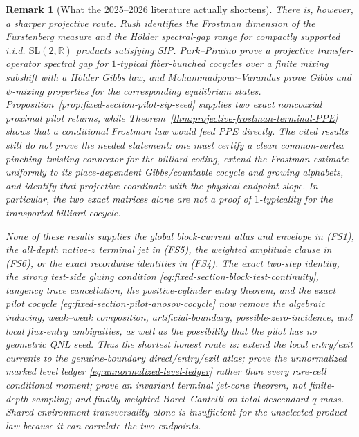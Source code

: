 \documentclass[11pt]{article}
\newtheorem{remark}[theorem]{Remark}
\begin{document}
\begin{remark}[What the 2025--2026 literature actually shortens]
There is, however, a sharper projective route.  Rush
\cite{RushFrostman} identifies the Frostman dimension of the Furstenberg
measure and the H\"older spectral-gap range for compactly supported
i.i.d. $\mathrm{SL}(2,\mathbb R)$ products satisfying SIP.
Park--Piraino \cite{ParkPiraino} prove a projective transfer-operator
spectral gap for $1$-typical fiber-bunched cocycles over a finite mixing
subshift with a H\"older Gibbs law, and
Mohammadpour--Varandas \cite{MohammadpourVarandas} prove Gibbs and
$\psi$-mixing properties for the corresponding equilibrium states.
Proposition~\ref{prop:fixed-section-pilot-sip-seed} supplies two exact
noncoaxial proximal pilot returns, while
Theorem~\ref{thm:projective-frostman-terminal-PPE} shows that a conditional
Frostman law would feed PPE directly.  The cited results still do not prove
the needed statement: one must certify a clean common-vertex
pinching--twisting connector for the billiard coding, extend the Frostman
estimate uniformly to its place-dependent Gibbs/countable cocycle and
growing alphabets, and identify that projective coordinate with the physical
endpoint slope.  In particular, the two exact matrices alone are not a
proof of $1$-typicality for the transported billiard cocycle.

None of these results supplies the global block-current atlas and envelope
in \textup{(FS1)}, the all-depth
native-$z$ terminal jet in \textup{(FS5)}, the weighted amplitude clause in
\textup{(FS6)}, or the exact recordwise identities in \textup{(FS4)}.
The exact two-step identity, the strong test-side gluing condition
\eqref{eq:fixed-section-block-test-continuity}, tangency trace cancellation,
the positive-cylinder entry theorem, and the exact pilot cocycle
\eqref{eq:fixed-section-pilot-anosov-cocycle} now remove the algebraic inducing,
weak--weak composition, artificial-boundary, possible-zero-incidence, and
local flux-entry ambiguities, as well as the possibility that the pilot has
no geometric QNL seed.  Thus the shortest honest route is: extend the
local entry/exit currents to the genuine-boundary direct/entry/exit atlas;
prove the unnormalized marked level ledger
\eqref{eq:unnormalized-level-ledger} rather than every rare-cell conditional
moment; prove an invariant terminal jet-cone theorem,
not finite-depth sampling; and finally weighted Borel--Cantelli on total
descendant $q$-mass.  Shared-environment transversality alone is insufficient
for the unselected product law because it can correlate the two endpoints.
\end{remark}
\end{document}
